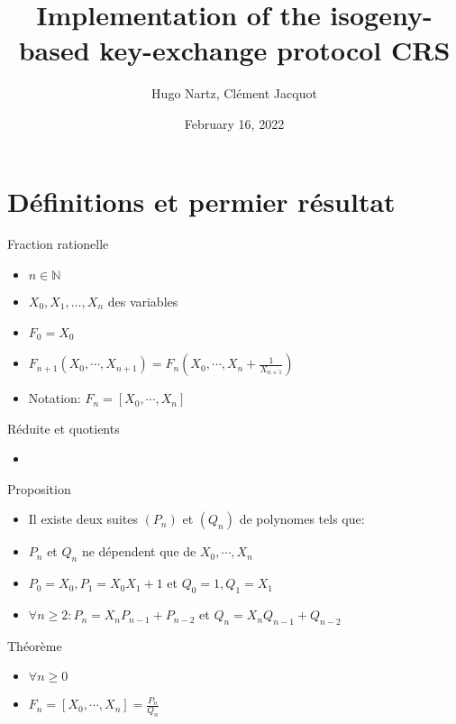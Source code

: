 \documentclass{beamer}
\title{Implementation of the isogeny-based key-exchange protocol CRS}
\author{Hugo Nartz, Cl\'ement Jacquot}
\date{February 16, 2022}
\begin{document}
\begin{frame}
  \titlepage
\end{frame}

\begin{frame}{}
  \tableofcontents
\end{frame}

\section{Définitions et permier résultat}

\begin{frame}{Fraction rationelle}
  \begin{itemize}
  \item {
    $ n \in \mathbb{N}$
  }
  \item {
    $X_0, X_1, \dots, X_n$ des variables
  }
  \item{
    $F_0 = X_0$
    }
  \item{
    $F_{n+1}(X_0,\cdots, X_{n+1} ) = F_n(X_0,\cdots,X_n +\frac{1}{X_{n+1} } ) $}
    \item{Notation: $F_n = [X_0,\cdots, X_n]$}
  \end{itemize}
\end{frame}

\begin{frame}{Réduite et quotients}
\begin{itemize}
    \item{}
\end{itemize}
\end{frame}

\begin{frame}{Proposition}
\begin{itemize}
    \item{Il existe deux suites $(P_n)$ et $(Q_n)$ de polynomes tels que:}
    \item{$P_n$ et $Q_n$ ne dépendent que de $X_0,\cdots,X_n$}
    \item{$P_0 = X_0, P_1 = X_0 X_1+1$ et $Q_0 = 1, Q_1 = X_1$}
    \item{$\forall n \geq 2: P_n = X_nP_{n-1}+P_{n-2}$ et $Q_n = X_n Q_{n-1}+Q_{n-2}$}
\end{itemize}
\end{frame}

\begin{frame}{Théorème}
\begin{itemize}
    \item{$\forall n \geq 0$}
    \item{$F_n = [X_0,\cdots, X_n] = \frac{P_n}{Q_n}$}
\end{itemize}
\end{frame}
\end{document}
